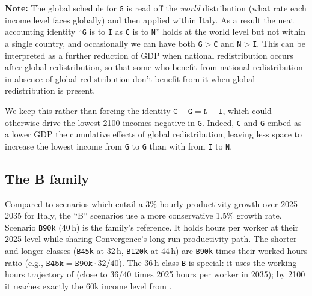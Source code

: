 \documentclass[12pt,a4paper]{article}
\newcommand{\note}[1]{%
  \begin{center}
    \colorbox{yellow!30}{\parbox{0.9\linewidth}{\textbf{Note:} #1}}
  \end{center}}
\newcommand{\scenario}[1]{\texttt{#1}}
\begin{document}
\note{%
  The global schedule for \scenario{G} is read off the \emph{world} distribution (what rate each income level faces globally) and then applied within Italy. As a result the neat accounting identity ``\scenario{G} is to \scenario{I} as \scenario{C} is to \scenario{N}'' holds at the world level but not within a single country, and occasionally we can have both \scenario{G}$>$\scenario{C} and \scenario{N}$>$\scenario{I}. This can be interpreted as a further reduction of GDP when national redistribution occurs after global redistribution, so that some who benefit from national redistribution in absence of global redistribution don't benefit from it when global redistribution is present. 

  We keep this rather than forcing the identity $\scenario{C} - \scenario{G} = \scenario{N} - \scenario{I}$, which could otherwise drive the lowest 2100 incomes negative in \scenario{G}. Indeed, \scenario{C} and \scenario{G} embed as a lower GDP the cumulative effects of global redistribution, leaving less space to increase the lowest income from \scenario{G} to \scenario{G} than with from \scenario{I} to \scenario{N}. 
  
}

\subsection{The B family} %
\label{sec:bfamily}

Compared to \cite{Chancel2026} scenarios which entail a 3\% hourly productivity growth over 2025--2035 for Italy, the ``B'' scenarios use a more conservative 1.5\% growth rate. Scenario \scenario{B90k} (40\,h) is the family's reference. It holds hours per worker at their 2025 level while sharing Convergence's long-run productivity path. 
The shorter and longer classes (\scenario{B45k} at 32\,h,
\scenario{B120k} at 44\,h) are \scenario{B90k} times their worked-hours ratio (e.g., $\scenario{B45k} = \scenario{B90k} \cdot 32/40$). The 36\,h class \scenario{B} is special: it uses the working hours trajectory of \cite{Chancel2026} (close to $36/40$ times 2025 hours per worker in 2035); by 2100 it reaches exactly the 60k income level from \cite{Chancel2026}.
\end{document}
